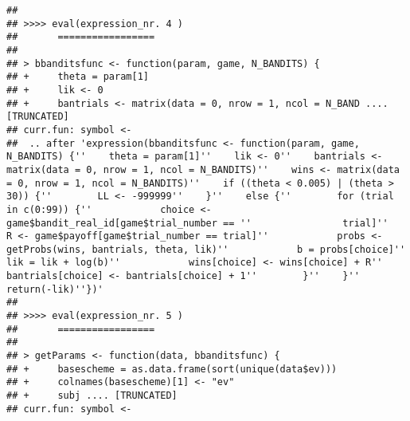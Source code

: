 \documentclass[11pt,,]{article}
\begin{document}
\begin{verbatim}
## 
## >>>> eval(expression_nr. 4 )
##       =================
## 
## > bbanditsfunc <- function(param, game, N_BANDITS) {
## +     theta = param[1]
## +     lik <- 0
## +     bantrials <- matrix(data = 0, nrow = 1, ncol = N_BAND .... [TRUNCATED] 
## curr.fun: symbol <-
##  .. after 'expression(bbanditsfunc <- function(param, game, N_BANDITS) {''    theta = param[1]''    lik <- 0''    bantrials <- matrix(data = 0, nrow = 1, ncol = N_BANDITS)''    wins <- matrix(data = 0, nrow = 1, ncol = N_BANDITS)''    if ((theta < 0.005) | (theta > 30)) {''        LL <- -999999''    }''    else {''        for (trial in c(0:99)) {''            choice <- game$bandit_real_id[game$trial_number == ''                trial]''            R <- game$payoff[game$trial_number == trial]''            probs <- getProbs(wins, bantrials, theta, lik)''            b = probs[choice]''            lik = lik + log(b)''            wins[choice] <- wins[choice] + R''            bantrials[choice] <- bantrials[choice] + 1''        }''    }''    return(-lik)''})'
## 
## >>>> eval(expression_nr. 5 )
##       =================
## 
## > getParams <- function(data, bbanditsfunc) {
## +     basescheme = as.data.frame(sort(unique(data$ev)))
## +     colnames(basescheme)[1] <- "ev"
## +     subj .... [TRUNCATED] 
## curr.fun: symbol <-

\end{verbatim}
\end{document}
